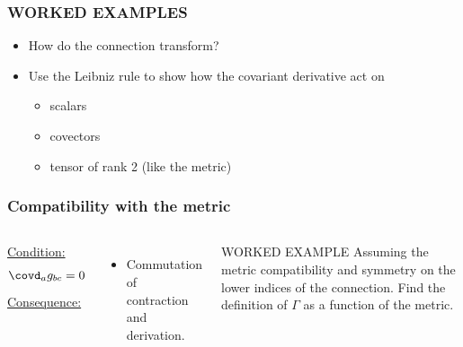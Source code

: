 {
\begin{frame}
  \frametitle{\alert{WORKED EXAMPLES}}
  \begin{itemize}%
  \item How do the connection transform?
  \item Use the Leibniz rule to show how the covariant derivative act on 
    \begin{itemize}
    \item scalars
    \item covectors
    \item tensor of rank 2 (like the metric)
    \end{itemize}
  \end{itemize}
\end{frame}
}

\begin{frame}
  \frametitle{Compatibility with the metric}
  \begin{columns}
    \uline{Condition:}
    \begin{align*}
      \covd_a g_{bc} =0
    \end{align*}
    \uline{Consequence:}
    \begin{itemize}
    \item Commutation of contraction and derivation.
    \end{itemize}
    \begin{alertblock}{WORKED EXAMPLE}
      Assuming the metric compatibility and symmetry on the lower indices of the connection. Find the definition of  $\Gamma$ as a function of the metric.
    \end{alertblock}
  \end{columns}
\end{frame}
